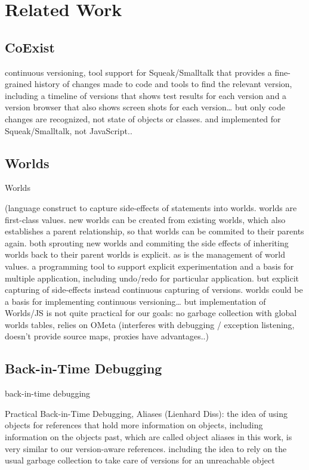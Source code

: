 \section{Related Work} \label{sec:RELATED_WORK}

\subsection{CoExist}

continuous versioning, tool support for Squeak/Smalltalk that provides a fine-grained history of changes made to code and tools to find the relevant version, including a timeline of versions that shows test results for each version and a version browser that also shows screen shots for each version… but only code changes are recognized, not state of objects or classes. and implemented for Squeak/Smalltalk, not JavaScript..


\subsection{Worlds}
Worlds~\cite{Warth2011Wor}

(language construct to capture side-effects of statements into worlds. worlds are first-class values. new worlds can be created from existing worlds, which also establishes a parent relationship, so that worlds can be commited to their parents again. both sprouting new worlds and commiting the side effects of inheriting worlds back to their parent worlds is explicit. as is the management of world values. a programming tool to support explicit experimentation and a basis for multiple application, including undo/redo for particular application. but explicit capturing of side-effects instead continuous capturing of versions. 
worlds could be a basis for implementing continuous versioning… but implementation of Worlds/JS is not quite practical for our goals: no garbage collection with global worlds tables, relies on OMeta (interferes with debugging / exception listening, doesn’t provide source maps, proxies have advantages..)


\subsection{Back-in-Time Debugging}

back-in-time debugging

Practical Back-in-Time Debugging, Aliases (Lienhard Diss): the idea of using objects for references that hold more information on objects, including information on the objects past, which are called object aliases in this work, is very similar to our version-aware references. including the idea to rely on the usual garbage collection to take care of versions for an unreachable object

